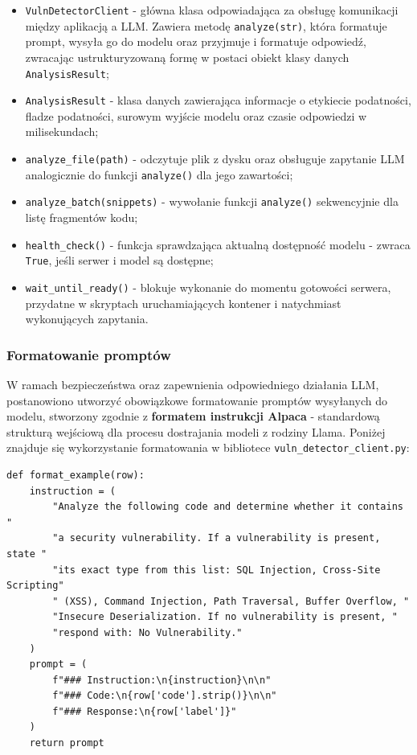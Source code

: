 \documentclass[12pt,a4paper]{article}
\begin{document}
\begin{itemize}
    \item \texttt{VulnDetectorClient} - główna klasa odpowiadająca za obsługę komunikacji między aplikacją a LLM.
    Zawiera metodę \texttt{analyze(str)}, która formatuje prompt, wysyła go do modelu oraz przyjmuje i formatuje 
    odpowiedź, zwracając ustrukturyzowaną formę w postaci obiekt klasy danych \texttt{AnalysisResult}; 
    
    \item \texttt{AnalysisResult} - klasa danych zawierająca informacje o etykiecie podatności, fladze podatności, surowym wyjście modelu oraz czasie odpowiedzi 
    w milisekundach;

    \item \texttt{analyze\_file(path)} - odczytuje plik z dysku oraz obsługuje zapytanie LLM analogicznie do funkcji \texttt{analyze()} dla jego zawartości;

    \item \texttt{analyze\_batch(snippets)} - wywołanie funkcji \texttt{analyze()} sekwencyjnie dla listę fragmentów kodu;

    \item \texttt{health\_check()} - funkcja sprawdzająca aktualną dostępność modelu - zwraca \texttt{True}, jeśli serwer i model
    są dostępne;

    \item \texttt{wait\_until\_ready()} - blokuje wykonanie do momentu gotowości serwera, przydatne w skryptach uruchamiających kontener
    i natychmiast wykonujących zapytania.

\end{itemize}


\subsubsection{Formatowanie promptów}

W ramach bezpieczeństwa oraz zapewnienia odpowiedniego działania LLM, postanowiono utworzyć obowiązkowe formatowanie promptów wysyłanych do modelu, stworzony 
zgodnie z \textbf{formatem instrukcji Alpaca} - standardową strukturą wejściową dla procesu dostrajania modeli z rodziny Llama. Poniżej znajduje się 
wykorzystanie formatowania w bibliotece \texttt{vuln\_detector\_client.py}:

\begin{tcolorbox}
\begin{verbatim}
def format_example(row):
    instruction = (
        "Analyze the following code and determine whether it contains "
        "a security vulnerability. If a vulnerability is present, state "
        "its exact type from this list: SQL Injection, Cross-Site Scripting"
        " (XSS), Command Injection, Path Traversal, Buffer Overflow, "
        "Insecure Deserialization. If no vulnerability is present, "
        "respond with: No Vulnerability."
    )
    prompt = (
        f"### Instruction:\n{instruction}\n\n"
        f"### Code:\n{row['code'].strip()}\n\n"
        f"### Response:\n{row['label']}"
    )
    return prompt
\end{verbatim}
\end{tcolorbox}
\end{document}
